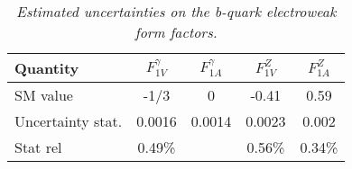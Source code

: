 \begin{table}
        \begin{center}
        \begin{tabular}{l c c c c}
        \hline
	Quantity  			& $F_{1V}^\gamma$ & $F_{1A}^\gamma$ &  $F_{1V}^Z$ &  $F_{1A}^Z$\\
	\hline
	SM value  			& -1/3   			& 0				  & -0.41		& 0.59\\
	Uncertainty stat.   & 0.0016   			& 0.0014		  & 0.0023 		& 0.002\\
	Stat rel			& 0.49\%			& 				  & 0.56\%		& 0.34\%\\
        \hline
        \end{tabular}
        \end{center}
        \caption{\sl Estimated uncertainties on the b-quark electroweak form factors.}
        \label{table:fffinal}
\end{table}
